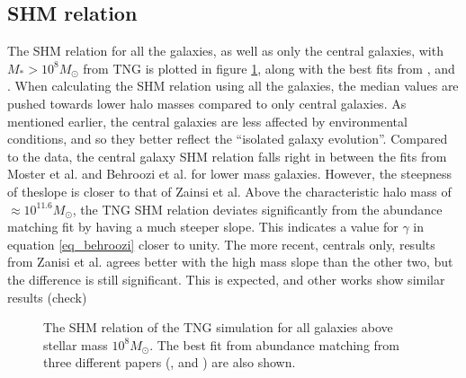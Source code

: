 
\subsection{SHM relation}
The SHM relation for all the galaxies, as well as only the central galaxies, with $M_{*} > 10^8 M_{\odot}$ from TNG is plotted in figure \ref{shmr_res}, along with the best fits from \cite{Moster2012}, \cite{Behroozi2013} and \cite{Zanisi2019}.
When calculating the SHM relation using all the galaxies, the median values are pushed towards lower halo masses compared to only central galaxies. As mentioned earlier, the central galaxies are less affected by environmental conditions, and so they better reflect the ``isolated galaxy evolution''. Compared to the data, the central galaxy SHM relation falls right in between the fits from Moster et al. and Behroozi et al. for lower mass galaxies. However, the steepness of theslope is closer to that of Zainsi et al. Above the characteristic halo mass of $\approx 10^{11.6} M_{\odot}$, the TNG SHM relation deviates significantly from the abundance matching fit by having a much steeper slope. This indicates a value for $\gamma$ in equation \ref{eq_behroozi} closer to unity. The more recent, centrals only, results from Zanisi et al. agrees better with the high mass slope than the other two, but the difference is still significant. This is expected, and other works show similar results (check)


\begin{figure}
    \centering
    \caption{The SHM relation of the TNG simulation for all galaxies above stellar mass $10^8 M_{\odot}$. The best fit from abundance matching from three different papers (\cite{Moster2012}, \cite{Behroozi2013} and \cite{Zanisi2019}) are also shown.} 
    \label{shmr_res}
\end{figure}


